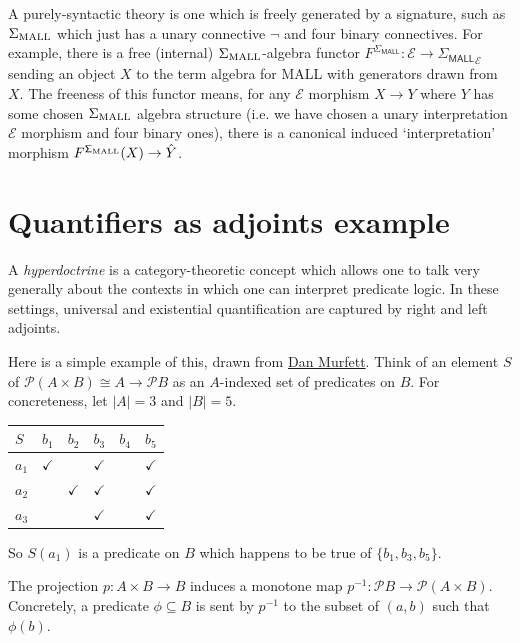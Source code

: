 \documentclass{article}
\theoremstyle{definition}
\newcommand{\cE}{\mathcal{E}}
\newcommand{\cP}{\mathcal{P}}
\newcommand{\cat}[1]{\mathsf{#1}}
\begin{document}
A purely-syntactic theory is one which is freely generated by a signature, such as $\Sigma_{\rm MALL}$ which just has a unary connective $\neg$ and four binary connectives. 
For example, there is a free (internal) $\Sigma_{\rm MALL}$-algebra functor $F^\cat{\Sigma_{MALL}}\colon \cE\to \cat{\Sigma_{MALL}}_\cE$ sending an object $X$ to the term algebra for MALL with generators drawn from $X$. The freeness of this functor means, for any $\cE$ morphism $X \to Y$ where $Y$ has some chosen $\Sigma_{\rm MALL}$ algebra structure (i.e. we have chosen a unary interpretation $\cE$ morphism and four binary ones), there is a canonical induced `interpretation' morphism $F^\cat{\Sigma_{\rm MALL}}(X)\to \hat Y$. 


\section{Quantifiers as adjoints example}
\label{sec:quantadjoints}

A {\it hyperdoctrine} is a category-theoretic concept which allows one to talk very generally about the contexts in which one can interpret predicate logic. In these settings, universal and existential quantification are captured by right and left adjoints. 

Here is a simple example of this, drawn from \href{https://therisingsea.org/notes/ch2018-lecture13.pdf}{Dan Murfett}. Think of an element $S$ of $\cP(A\times B)\cong A \to \cP B$ as an $A$-indexed set of predicates on $B$. For concreteness, let $|A|=3$ and $|B|=5$.

\begin{table}[h!]
\centering
\begin{tabular}{|l|l|l|l|l|l|}
\hline
$S$   & $b_1$        & $b_2$        & $b_3$        & $b_4$ & $b_5$        \\ \hline
$a_1$ & $\checkmark$ &              & $\checkmark$ &       & $\checkmark$ \\ \hline
$a_2$ &              & $\checkmark$ & $\checkmark$ &       & $\checkmark$ \\ \hline
$a_3$ &              &              & $\checkmark$ &       & $\checkmark$ \\ \hline
\end{tabular}
\end{table}

So $S(a_1)$ is a predicate on $B$ which happens to be true of $\{b_1,b_3,b_5\}$.

The projection $p\colon A\times B\to B$ induces a monotone map $p^{-1}\colon \cP B\to \cP(A\times B)$. Concretely, a predicate $\phi\subseteq B$ is sent by $p^{-1}$ to the subset of $(a,b)$ such that $\phi(b)$. 
\end{document}
